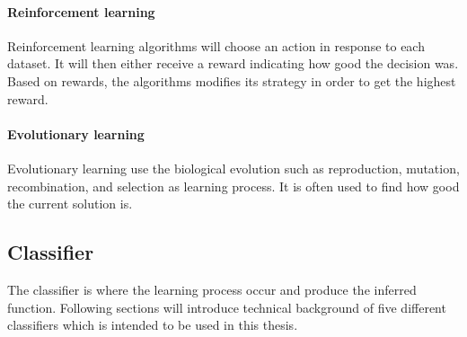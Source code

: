 \documentclass[USenglish]{ifimaster}  %
\begin{document}
\paragraph{Reinforcement learning}
Reinforcement learning algorithms will choose an action in response to each dataset. It will then either receive a reward indicating how good the decision was. Based on rewards, the algorithms modifies its strategy in order to get the highest reward.

\paragraph{Evolutionary learning}
Evolutionary learning use the biological evolution such as reproduction, mutation, recombination, and selection as learning process. It is often used to find how good the current solution is.

\subsection{Classifier}
The classifier is where the learning process occur and produce the inferred function. Following sections will introduce technical background of five different classifiers which is intended to be used in this thesis.
\end{document}
